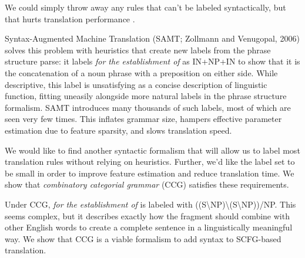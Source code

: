 \documentclass[a4paper]{article}
\begin{document}
We could simply throw away any rules that can't be labeled syntactically, but that hurts translation performance \cite{koehn-och-marcu-2003,deneefe-syntax-and-phrase-mt}.

Syntax-Augmented Machine Translation 
(SAMT; Zollmann and Venugopal, 2006) \nocite{samt-wmt06} %
solves this problem with heuristics that create new labels from the phrase structure parse: it labels {\em for the establishment of} as IN+NP+IN to show that it is the concatenation of a noun phrase with a preposition on either side. While descriptive, this label is unsatisfying as a concise description of linguistic function, fitting uneasily alongside more natural labels in the phrase structure formalism. SAMT introduces many thousands of such labels, most of which are seen very few times. This inflates grammar size, hampers effective parameter estimation due to feature sparsity, and slows translation speed.

We would like to find another syntactic formalism that will allow us to label most translation rules without relying on heuristics. Further, we'd like the label set to be small in order to improve feature estimation and reduce translation time. We show that {\em combinatory categorial grammar} (CCG) satisfies these requirements.

Under CCG, {\em for the establishment of} is labeled with ((S\textbackslash NP)\textbackslash (S\textbackslash NP))/NP. This seems complex, but it describes exactly how the fragment should combine with other English words to create a complete sentence in a linguistically meaningful way. We show that CCG is a viable  formalism to add syntax to SCFG-based translation.

%
\end{document}
